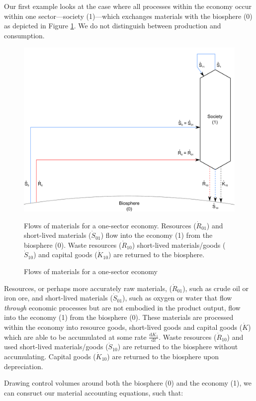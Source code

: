 Our first example looks at the case where all processes within the economy occur within
one sector---society (1)---which exchanges materials with the biosphere (0) as depicted in
Figure \ref{fig:A_materials}.  We do not distinguish between production and consumption.



\begin{figure}[h!]
\centering
\includegraphics[width=0.8\linewidth]{Part_1/Chapter_Materials/images/1_sector_materials.pdf}
\caption{Flows of materials for a one-sector economy}{Flows of materials for a one-sector economy. 
Resources ($\dot{R}_{01}$) and short-lived materials ($\dot{S}_{01}$) flow into the economy (1) 
from the biosphere (0). Waste resources ($\dot{R}_{10}$) short-lived materials/goods 
($\dot{S}_{10}$) and capital goods ($\dot{K}_{10}$) are returned to the biosphere.}
\label{fig:A_materials}
\end{figure}

Resources, or perhaps more accurately raw materials, ($\dot{R}_{01}$), such as crude oil or iron ore, 
and short-lived materials ($\dot{S}_{01}$), such as oxygen or water that flow \emph{through} economic
processes but are not embodied in the product output, flow into the economy (1) from the biosphere (0). 
These materials are processed within the economy into resource goods, short-lived goods and
capital goods ($\dot{K}$) which are able to be accumulated at some rate $\frac{\mathrm{d}K_{1}}{\mathrm{d}t}$.
Waste resources ($\dot{R}_{10}$) and used short-lived materials/goods ($\dot{S}_{10}$)
are returned to the biosphere without accumulating. Capital goods ($\dot{K}_{10}$) are returned
to the biosphere upon depreciation.

Drawing control volumes around both the biosphere (0) and the economy (1), we can consruct
our material accounting equations, such that:

